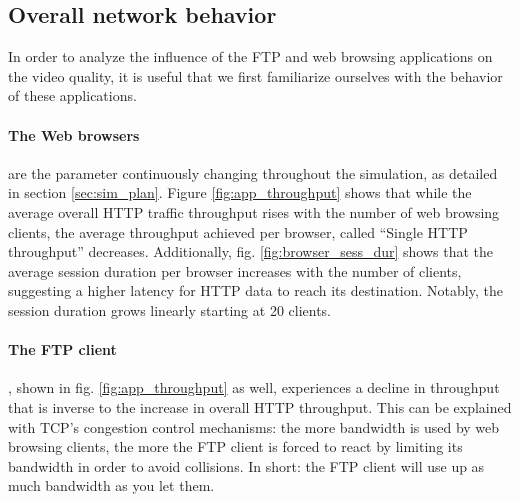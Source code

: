 \documentclass[
10pt, %
a4paper, %
oneside, %
headinclude,footinclude, %
BCOR5mm, %
]{scrartcl}
\begin{document}
\subsection{Overall network behavior}



In order to analyze the influence of the FTP and web browsing applications on the video quality, it is useful that we first familiarize ourselves with the behavior of these applications.

\paragraph{The Web browsers} are the parameter continuously changing throughout the simulation, as detailed in section \ref{sec:sim_plan}. Figure \ref{fig:app_throughput} shows that while the average overall HTTP traffic throughput rises with the number of web browsing clients, the average throughput achieved per browser, called ``Single HTTP throughput'' decreases. Additionally, fig. \ref{fig:browser_sess_dur} shows that the average session duration per browser increases with the number of clients, suggesting a higher latency for HTTP data to reach its destination. Notably, the session duration grows linearly starting at 20 clients.

\paragraph{The FTP client}, shown in fig. \ref{fig:app_throughput} as well, experiences a %
decline in throughput that is inverse to the increase in overall HTTP throughput. This can be explained with TCP's congestion control mechanisms: the more bandwidth is used by web browsing clients, the more the FTP client is forced to react by limiting its bandwidth in order to avoid collisions. In short: the FTP client will use up as much bandwidth as you let them.
\end{document}
